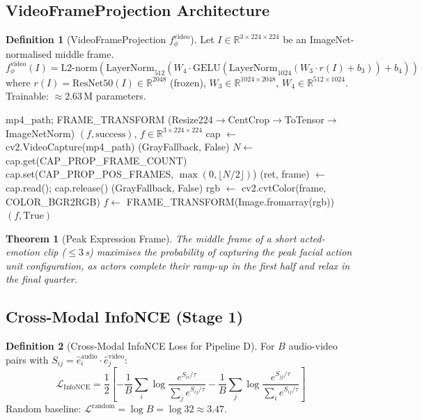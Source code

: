 \documentclass[12pt,a4paper]{article}
\theoremstyle{definition}
\newtheorem{definition}{Definition}[section]
\theoremstyle{plain}
\newtheorem{theorem}{Theorem}[section]
\theoremstyle{remark}
\newcommand{\R}{\mathbb{R}}
\newcommand{\LN}{\mathrm{LayerNorm}}
\newcommand{\GELU}{\mathrm{GELU}}
\begin{document}
\subsection{VideoFrameProjection Architecture}

\begin{definition}[VideoFrameProjection $f_\phi^{\text{video}}$]
Let $I \in \R^{3 \times 224 \times 224}$ be an ImageNet-normalised middle frame.
\[
  f_\phi^{\text{video}}(I) = \text{L2-norm}\!\left(\LN_{512}(W_4 \cdot \GELU(\LN_{1024}(W_3 \cdot r(I) + b_3)) + b_4)\right)
\]
where $r(I) = \text{ResNet50}(I) \in \R^{2048}$ (frozen), $W_3 \in \R^{1024 \times 2048}$, $W_4 \in \R^{512 \times 1024}$. Trainable: $\approx$2.63\,M parameters.
\end{definition}

\begin{algorithm}[H]
\caption{CREMA-D Middle-Frame Extraction}
\label{alg:frame_extract}
\begin{algorithmic}[1]
\Require mp4\_path; FRAME\_TRANSFORM (Resize224$\to$CentCrop$\to$ToTensor$\to$ImageNetNorm)
\Ensure $(f, \text{success})$, $f \in \R^{3 \times 224 \times 224}$
\State cap $\gets$ cv2.VideoCapture(mp4\_path)
 \Return (GrayFallback, False) \EndIf
\State $N \gets$ cap.get(CAP\_PROP\_FRAME\_COUNT)
\State cap.set(CAP\_PROP\_POS\_FRAMES, $\max(0, \lfloor N/2 \rfloor)$) 
\State (ret, frame) $\gets$ cap.read(); cap.release()
 \Return (GrayFallback, False) \EndIf
\State rgb $\gets$ cv2.cvtColor(frame, COLOR\_BGR2RGB)
\State $f \gets$ FRAME\_TRANSFORM(Image.fromarray(rgb))
\State \Return $(f, \text{True})$
\end{algorithmic}
\end{algorithm}

\begin{theorem}[Peak Expression Frame]
The middle frame of a short acted-emotion clip ($\le 3$\,s) maximises the probability of capturing the peak facial action unit configuration, as actors complete their ramp-up in the first half and relax in the final quarter.
\end{theorem}

\subsection{Cross-Modal InfoNCE (Stage 1)}

\begin{definition}[Cross-Modal InfoNCE Loss for Pipeline D]
For $B$ audio-video pairs with $S_{ij} = \hat{e}_i^{\text{audio}} \cdot \hat{e}_j^{\text{video}}$:
\[
  \mathcal{L}_{\text{InfoNCE}} = \frac{1}{2}\!\left[
    -\frac{1}{B}\sum_i \log\frac{e^{S_{ii}/\tau}}{\sum_j e^{S_{ij}/\tau}}
    -\frac{1}{B}\sum_j \log\frac{e^{S_{jj}/\tau}}{\sum_i e^{S_{ij}/\tau}}
  \right]
\]
Random baseline: $\mathcal{L}^{\text{random}} = \log B = \log 32 \approx 3.47$.
\end{definition}
\end{document}
